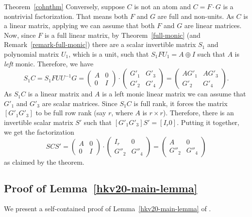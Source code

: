 \begin{proofof}{Theorem~\ref{cohnthm}}
Conversely, suppose $C$ is not an atom and $C=F\cdot G$ is a
nontrivial factorization. That means both $F$ and $G$ are full and
non-units. As $C$ is a linear matrix, applying \cite[Lemma
  5.8.7]{Cohnfir} we can assume that both $F$ and $G$ are linear
matrices. Now, since $F$ is a full linear matrix, by
Theorem~\ref{full-monic} (and Remark~\ref{remark-full-monic}) there
are a scalar invertible matrix $S_1$ and polynomial matrix $U_1$,
which is a unit, such that $S_1FU_1 = A\oplus I$ such that $A$ is
\emph{left} monic. Therefore, we have
\[
S_1 C = S_1 F U U^{-1} G = \left(
\begin{array}{cc}
A & 0 \\
0 & I
\end{array}
\right) \cdot \left(
\begin{array}{cc}
G'_1 & G'_3 \\
G'_2 & G'_4
\end{array}
\right) = \left(
\begin{array}{cc}
AG'_1 & AG'_3 \\
G'_2 & G'_4
\end{array}
\right).
\]
As $S_1 C$ is a linear matrix and $A$ is a left monic linear matrix we
can assume that $G'_1$ and $G'_3$ are scalar matrices. Since $S_1 C$ is
full rank, it forces the matrix $[G'_1 G'_3]$ to be full row rank (say
$r$, where $A$ is $r\times r$). Therefore, there is an invertible
scalar matrix $S'$ such that $[G'_1 G'_3]S' = [I_r 0]$. Putting it together,
we get the factorization
\[
SCS' = \left(
\begin{array}{cc}
A & 0 \\
0 & I
\end{array}
\right) \cdot
\left(
\begin{array}{cc}
I_r & 0 \\
G''_2 & G''_4
\end{array}
\right) =  \left(
\begin{array}{cc}
A & 0 \\
G''_2 & G''_4
\end{array}
\right)
\]
as claimed by the theorem.
\end{proofof}



\subsection{Proof of Lemma~\ref{hkv20-main-lemma}}


We present a self-contained proof of Lemma~\ref{hkv20-main-lemma} of
\cite{HKV20}.

